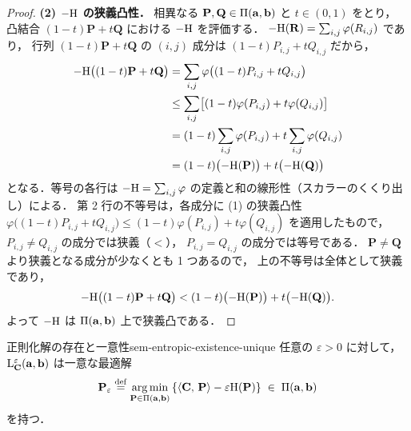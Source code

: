 \begin{proof}
  \textbf{(2) $-\mathrm{H}$ の狭義凸性．}
  相異なる $\mathbf{P}, \mathbf{Q} \in \Pi(\mathbf{a}, \mathbf{b})$ と $t \in (0,1)$ をとり，
  凸結合 $(1-t)\mathbf{P} + t\mathbf{Q}$ における $-\mathrm{H}$ を評価する．
  $-\mathrm{H}(\mathbf{R}) = \sum_{i,j}\varphi(R_{i,j})$ であり，
  行列 $(1-t)\mathbf{P} + t\mathbf{Q}$ の $(i,j)$ 成分は $(1-t)P_{i,j} + tQ_{i,j}$ だから，
  \begin{align*}
    -\mathrm{H}\bigl((1-t)\mathbf{P} + t\mathbf{Q}\bigr)
    &= \sum_{i,j}\varphi\bigl((1-t)P_{i,j} + tQ_{i,j}\bigr) \\
    &\leq \sum_{i,j}\bigl[(1-t)\varphi(P_{i,j}) + t\varphi(Q_{i,j})\bigr] \\
    &= (1-t)\sum_{i,j}\varphi(P_{i,j}) + t\sum_{i,j}\varphi(Q_{i,j}) \\
    &= (1-t)\bigl(-\mathrm{H}(\mathbf{P})\bigr) + t\bigl(-\mathrm{H}(\mathbf{Q})\bigr)
  \end{align*}
  となる．等号の各行は $-\mathrm{H} = \sum_{i,j}\varphi$ の定義と和の線形性（スカラーのくくり出し）による．
  第 2 行の不等号は，各成分に (1) の狭義凸性
  $\varphi\bigl((1-t)P_{i,j}+tQ_{i,j}\bigr) \leq (1-t)\varphi(P_{i,j}) + t\varphi(Q_{i,j})$
  を適用したもので，$P_{i,j} \neq Q_{i,j}$ の成分では狭義（$<$），
  $P_{i,j} = Q_{i,j}$ の成分では等号である．
  $\mathbf{P} \neq \mathbf{Q}$ より狭義となる成分が少なくとも 1 つあるので，
  上の不等号は全体として狭義であり，
  \[
    -\mathrm{H}\bigl((1-t)\mathbf{P} + t\mathbf{Q}\bigr)
    < (1-t)\bigl(-\mathrm{H}(\mathbf{P})\bigr) + t\bigl(-\mathrm{H}(\mathbf{Q})\bigr).
  \]
  よって $-\mathrm{H}$ は $\Pi(\mathbf{a}, \mathbf{b})$ 上で狭義凸である．
\end{proof}

\begin{proposition}{正則化解の存在と一意性}{sem-entropic-existence-unique}
  任意の $\varepsilon > 0$ に対して，
  $\mathrm{L}_{\mathbf{C}}^\varepsilon(\mathbf{a}, \mathbf{b})$ は一意な最適解
  \[
    \mathbf{P}_\varepsilon
    \overset{\mathrm{def}}{=}
    \operatorname*{arg\,min}_{\mathbf{P} \in \Pi(\mathbf{a}, \mathbf{b})}
    \left\{
      \langle \mathbf{C},\, \mathbf{P} \rangle
      - \varepsilon \mathrm{H}(\mathbf{P})
    \right\}
    \;\in\; \Pi(\mathbf{a}, \mathbf{b})
  \]
  を持つ．
\end{proposition}

